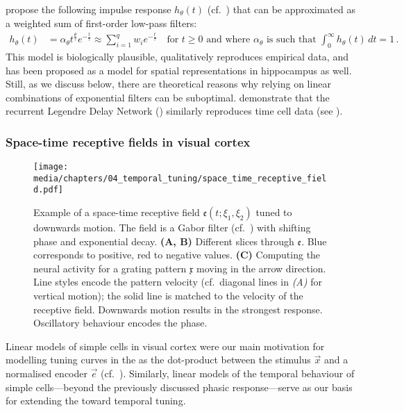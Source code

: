 \citet{howard2014unified} propose the following impulse response $h_\theta(t)$ (cf.~) that can be approximated as a weighted sum of first-order low-pass filters:
\begin{align*}
	h_\theta(t)
	&=
		\alpha_\theta t^{\frac{\theta}{\tau}} e^{-\frac{t}{\tau}}
	\approx
		\sum_{i = 1}^q w_i e^{-\frac{t}{\tau}}
	\quad \text{for } t \geq 0 \text{ and where } \alpha_\theta \text{ is such that } \int_{0}^\infty h_\theta(t) \,dt = 1 \,.
\end{align*}
This model is biologically plausible, qualitatively reproduces empirical data, and has been proposed as a model for spatial representations in hippocampus as well.
Still, as we discuss below, there are theoretical reasons why relying on linear combinations of exponential filters can be suboptimal.
 demonstrate that the recurrent Legendre Delay Network (\LDN) similarly reproduces time cell data (see ).

\subsubsection{Space-time receptive fields in visual cortex}

\begin{figure}
	\centering
	\texttt{[image: media/chapters/04\_temporal\_tuning/space\_time\_receptive\_field.pdf]}%
	{\label{fig:space_time_receptive_field_a}}%
	{\label{fig:space_time_receptive_field_b}}%
	{\label{fig:space_time_receptive_field_c}}%
	\caption[Example of a space-time receptive field tuned to downwards motion]{Example of a space-time receptive field $\mathfrak{e}(t; \xi_1, \xi_2)$ tuned to downwards motion. The field is a Gabor filter (cf.~) with shifting phase and exponential decay.
	\textbf{(A, B)} Different slices through $\mathfrak{e}$.
	Blue corresponds to positive, red to negative values.
	\textbf{(C)} Computing the neural activity for a grating pattern $\mathfrak{x}$ moving in the arrow direction.
	Line styles encode the pattern velocity (cf.~diagonal lines in \emph{(A)} for vertical motion); the solid line is matched to the velocity of the receptive field.
	Downwards motion results in the strongest response.
	Oscillatory behaviour encodes the phase.
	}
	\label{fig:space_time_receptive_field}
\end{figure}

Linear models of simple cells in visual cortex were our main motivation for modelling tuning curves in the \NEF as the dot-product between the stimulus $\vec x$ and a normalised encoder $\vec e$ (cf.~).
Similarly, linear models of the temporal behaviour of simple cells---beyond the previously discussed phasic response---serve as our basis for extending the \NEF toward temporal tuning.

